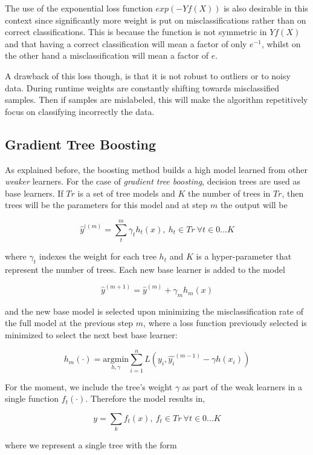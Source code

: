 \documentclass{article}%
\theoremstyle{definition}
\begin{document}
The use of the exponential loss function $exp(-Yf(X))$ is also desirable in this context since significantly more weight is put on misclassifications rather than on correct classifications. This is because the function is not symmetric in $Yf(X)$ and that having a correct classification will mean a factor of only $e^{-1}$, whilst on the other hand a misclassification will mean a factor of $e$.

A drawback of this loss though, is that it is not robust to outliers or to noisy data. During runtime weights are constantly shifting towards misclassified samples. Then if samples are mislabeled, this will make the algorithm repetitively focus on classifying incorrectly the data. 



\subsection{Gradient Tree Boosting}

As explained before, the boosting method builds a high model learned from other \textit{weaker} learners. For the case of \textit{gradient tree boosting}, decision trees are used as base learners. If $Tr$ is a set of tree models and $K$ the number of trees in $Tr$, then trees will be the parameters for this model and at step $m$ the output will be

\[
\hat{y}^{((m)}=  \sum_t^m \gamma_t h_t(x) , \  h_t \in Tr \ \forall t \in {0...K}
\]

where $\gamma_t$ indexes the weight for each tree $h_t$ and $K$ is a hyper-parameter that represent the number of trees. Each new base learner is added to the model 

\[
\hat{y}^{(m+1)} =   \hat{y}^{(m)}  + \gamma_m h_m(x) 
\]

and the new base model is selected upon minimizing the misclassification rate of the full model at the previous step $m$, where a loss function previously selected is minimized to select the next best base learner:

\[
h_m(\cdot) = \underset{h,\gamma}{\mathrm{argmin}}   \sum_{i=1}^{n} L ( y_i,  \hat{y_i}^{(m-1)} -  \gamma h(x_i)  ) 
\]


For the moment, we include the tree's weight $\gamma$ as part of the weak learners in a single function $f_t(\cdot)$. Therefore the model results in,

\[
y =  \sum_k f_t(x) ,  \ f_t \in Tr  \ \forall t \in {0...K}
\]

where we represent a single tree with the form 
\end{document}
